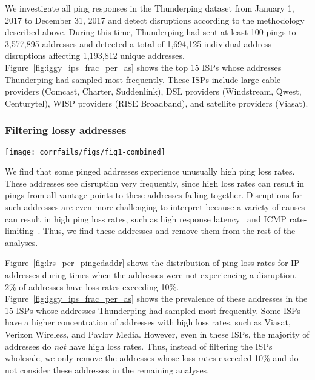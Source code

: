 We investigate all ping responses in the Thunderping dataset from
January 1, 2017 to December 31, 2017 and detect disruptions according
to the methodology described above.
%
During this time, Thunderping had sent at least 100 pings to 3,577,895
addresses and detected a total of 1,694,125 individual address
disruptions affecting 1,193,812 unique addresses.
%
Figure~\ref{fig:iggy_ips_frac_per_as} shows the top 15 ISPs whose
addresses Thunderping had sampled most frequently.
%
These ISPs include large cable providers (Comcast, Charter,
Suddenlink), DSL providers (Windstream, Qwest, Centurytel), WISP
providers (RISE Broadband), and satellite providers (Viasat).


\subsubsection*{Filtering lossy addresses}

\begin{figure*}[t]
\texttt{[image: corrfails/figs/fig1-combined]}
\caption{
\label{fig:lr}
\label{fig:lrs_per_pingedaddr}
\label{fig:iggy_ips_frac_per_as}
(Left)~The distribution of ping loss rates per IP address during times when Thunderping believed an
address was \emph{not} experiencing a disruption. While most addresses
have low loss rates, 2\% of addresses had loss rates exceeding
10\%. 
(Right)~The fraction of addresses per ISP with ping loss rates exceeding 10\%
during non-disruption periods, for the 15 ISPs with the most pinged
addresses. We filter from all remaining analyses any address whose
loss rate exceeded 10\%.
}
\end{figure*}

We find that some pinged addresses experience unusually high ping loss
rates. These addresses see disruption very frequently, since high loss
rates can result in pings from all vantage points to these addresses failing together. Disruptions for
such addresses are even more challenging to interpret because a variety
of causes can result in high ping loss rates, such as high response
latency~\cite{timeouts} and ICMP
rate-limiting~\cite{icmp-rate-limiting-pam18}. Thus, we find these
addresses and remove them from the rest of the analyses.

Figure~\ref{fig:lrs_per_pingedaddr} shows the distribution of ping
loss rates for IP addresses during times when the addresses were not
experiencing a disruption. 2\% of addresses have loss rates exceeding
10\%. Figure~\ref{fig:iggy_ips_frac_per_as} shows the prevalence of
these addresses in the 15 ISPs whose addresses Thunderping had sampled
most frequently. Some ISPs have a higher concentration of addresses
with high loss rates, such as Viasat, Verizon Wireless, and Pavlov
Media. However, even in these ISPs, the majority of addresses do
\emph{not} have high loss rates. Thus, instead of filtering the ISPs
wholesale, we only remove the addresses whose loss rates exceeded 10\%
and do not consider these addresses in the remaining analyses.

